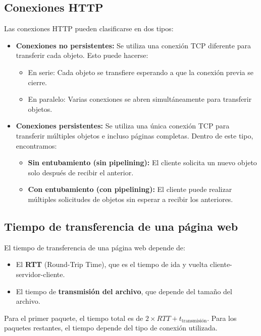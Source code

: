 \documentclass{article}
\begin{document}
\subsection{Conexiones HTTP}

Las conexiones HTTP pueden clasificarse en dos tipos:

\begin{itemize}
    \item \textbf{Conexiones no persistentes:} Se utiliza una conexión TCP diferente para transferir cada objeto. Esto puede hacerse:
    \begin{itemize}
        \item En serie: Cada objeto se transfiere esperando a que la conexión previa se cierre.
        \item En paralelo: Varias conexiones se abren simultáneamente para transferir objetos.
    \end{itemize}

    \item \textbf{Conexiones persistentes:} Se utiliza una única conexión TCP para transferir múltiples objetos e incluso páginas completas. Dentro de este tipo, encontramos:
    \begin{itemize}
        \item \textbf{Sin entubamiento (sin pipelining):} El cliente solicita un nuevo objeto solo después de recibir el anterior.
        \item \textbf{Con entubamiento (con pipelining):} El cliente puede realizar múltiples solicitudes de objetos sin esperar a recibir los anteriores.
    \end{itemize}
\end{itemize}

\subsection{Tiempo de transferencia de una página web}

El tiempo de transferencia de una página web depende de:

\begin{itemize}
    \item El \textbf{RTT} (Round-Trip Time), que es el tiempo de ida y vuelta cliente-servidor-cliente.
    \item El tiempo de \textbf{transmisión del archivo}, que depende del tamaño del archivo.
\end{itemize}

Para el primer paquete, el tiempo total es de $2 \times RTT + t_{\text{transmisión}}$. Para los paquetes restantes, el tiempo depende del tipo de conexión utilizada.
\end{document}

